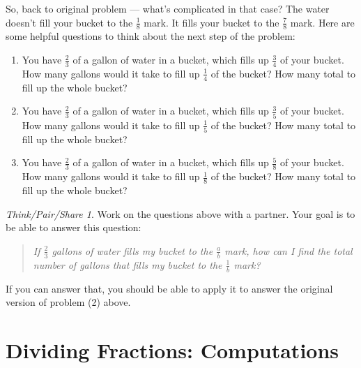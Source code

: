 \documentclass[10pt, reqno]{amsart}
\theoremstyle{remark}
\newtheorem*{thinkpair*}{Think/Pair/Share}
\theoremstyle{definition}
\numberwithin{equation}{section}  %
\begin{document}
So, back to original problem --- what's complicated in that case?  The water doesn't fill your bucket to the $\frac 1 8$ mark.  It fills your bucket to  the $\frac 7 8$ mark.
Here are some helpful questions to think about the next step of the problem:
\begin{enumerate}[(2a')]

\item
You have $\frac 2 3$ of a gallon of water in a bucket, which fills up $\frac 3 4$ of your bucket.  How many gallons  would it take to fill up $\frac 1 4$ of the bucket?  How many total to fill up the whole bucket?\\


\item
You have $\frac 2 3$ of a gallon of water in a bucket, which fills up $\frac 3 5$ of your bucket.  How many gallons  would it take to fill up $\frac 1 5$ of the bucket?  How many total to fill up the whole bucket?\\

\item
 You have $\frac 2 3$ of a gallon of water in a bucket, which fills up $\frac 5 8 $ of your bucket.  How many gallons  would it take to fill up $\frac 1 8$ of the bucket?  How many total to fill up the whole bucket?\\

\end{enumerate}


\begin{thinkpair*}
Work on the questions above with a partner.  Your goal is to be able to answer this question:

\begin{quotation}
\emph{If  $\frac 2 3$ gallons of water fills my bucket to the $\frac a b$ mark, how can I find the total number of gallons that fills my bucket to the $\frac 1 b$ mark?}
\end{quotation}

If you can answer that, you should be able to apply it to answer the original version of problem (2) above.
\end{thinkpair*}







\section{Dividing Fractions: Computations}
\end{document}
